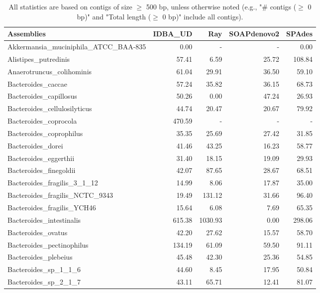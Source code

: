 \documentclass[12pt,a4paper]{article}
\begin{document}
\begin{table}[ht]
\begin{center}
\caption{All statistics are based on contigs of size $\geq$ 500 bp, unless otherwise noted (e.g., "\# contigs ($\geq$ 0 bp)" and "Total length ($\geq$ 0 bp)" include all contigs).}
\begin{tabular}{|l*{4}{|r}|}
\hline
Assemblies & IDBA\_UD & Ray & SOAPdenovo2 & SPAdes \\ \hline
Akkermansia\_muciniphila\_ATCC\_BAA-835 & 0.00 & - & - & 0.00 \\ \hline
Alistipes\_putredinis & 57.41 & 6.59 & 25.72 & 108.84 \\ \hline
Anaerotruncus\_colihominis & 61.04 & 29.91 & 36.50 & 59.10 \\ \hline
Bacteroides\_caccae & 57.24 & 35.82 & 36.15 & 68.73 \\ \hline
Bacteroides\_capillosus & 50.26 & 0.00 & 47.24 & 26.93 \\ \hline
Bacteroides\_cellulosilyticus & 44.74 & 20.47 & 20.67 & 79.92 \\ \hline
Bacteroides\_coprocola & 470.59 & - & - & - \\ \hline
Bacteroides\_coprophilus & 35.35 & 25.69 & 27.42 & 31.85 \\ \hline
Bacteroides\_dorei & 41.46 & 43.25 & 16.23 & 58.77 \\ \hline
Bacteroides\_eggerthii & 31.40 & 18.15 & 19.09 & 29.93 \\ \hline
Bacteroides\_finegoldii & 42.07 & 87.65 & 28.67 & 68.51 \\ \hline
Bacteroides\_fragilis\_3\_1\_12 & 14.99 & 8.06 & 17.87 & 35.00 \\ \hline
Bacteroides\_fragilis\_NCTC\_9343 & 19.49 & 131.12 & 31.66 & 96.40 \\ \hline
Bacteroides\_fragilis\_YCH46 & 15.64 & 6.08 & 7.69 & 65.35 \\ \hline
Bacteroides\_intestinalis & 615.38 & 1030.93 & 0.00 & 298.06 \\ \hline
Bacteroides\_ovatus & 42.20 & 27.62 & 15.57 & 58.70 \\ \hline
Bacteroides\_pectinophilus & 134.19 & 61.09 & 59.50 & 91.11 \\ \hline
Bacteroides\_plebeius & 45.48 & 42.30 & 25.36 & 54.85 \\ \hline
Bacteroides\_sp\_1\_1\_6 & 44.60 & 8.45 & 17.95 & 50.84 \\ \hline
Bacteroides\_sp\_2\_1\_7 & 43.11 & 65.71 & 12.41 & 81.07 \\ \hline

\end{tabular}
\end{center}
\end{table}
\end{document}
